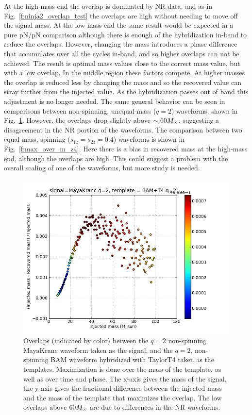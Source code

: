 At the high-mass end the overlap is dominated by NR data, and as in
Fig.~\ref{f:ninja2_overlap_test} the overlaps are high without
needing to move off the signal mass.  At the low-mass end the same
result would be expected in a pure pN/pN comparison although there is
enough of the hybridization in-band to reduce the overlaps.  However,
changing the mass introduces a phase difference that accumulates over
all the cycles in-band, and so higher overlaps can not be achieved.
The result is optimal mass values close to the correct mass value, but
with a low overlap.  In the middle region these factors compete.  At
higher masses the overlap is reduced less by changing the mass and so
the recovered value can stray further from the injected value.
As the hybridization passes out of band this adjustment is no
longer needed.  The same general behavior can be seen in comparisons
between non-spinning, unequal-mass ($q=2$) waveforms, shown in
Fig.~\ref{f:max_over_m_q2}.  However, the overlaps drop slightly
above $\sim 60 M_\odot$, suggesting a disagreement in the NR portion
of the waveforms.  The comparison between two equal-mass, spinning
($s_{1z} = s_{2z} = 0.4$) waveforms is shown in
Fig.~\ref{f:max_over_m_z4}.  Here there is a bias in recovered mass
at the high-mass end, although the overlaps are high.  This could
suggest a problem with the overall scaling of one of the waveforms,
but more study is needed.


\begin{figure}
  \includegraphics[width=\linewidth]{figures/ninja2/maya_bam_q2_max_over_m} 
  \caption[Overlaps between unequal-mass submissions maximized over mass]{
  \label{f:max_over_m_q2}
Overlaps (indicated by color) between the $q=2$ non-spinning MayaKranc
waveform taken as the signal, and the $q=2$, non-spinning BAM waveform
hybridized with TaylorT4 taken as the templates.  Maximization is done
over the mass of the template, as well as over time and phase.  The
x-axis gives the mass of the signal, the y-axis gives the fractional
difference between the injected mass and the mass of the template that
maximizes the overlap.  The low overlaps above $60 M_\odot$ are due
to differences in the NR waveforms.}
\end{figure}%


